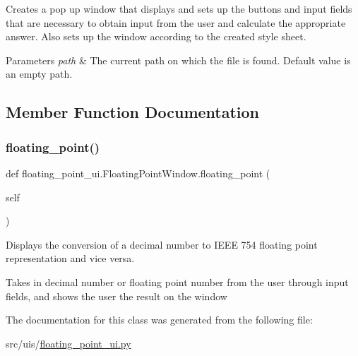 Creates a pop up window that displays and sets up the buttons and input fields that are necessary to obtain input from the user and calculate the appropriate answer. Also sets up the window according to the created style sheet. 
\begin{DoxyParams}{Parameters}
{\em path} & The current path on which the file is found. Default value is an empty path. \\
\hline
\end{DoxyParams}


\subsection{Member Function Documentation}
\mbox{\label{classfloating__point__ui_1_1_floating_point_window_a3e36de9fde9b6387740d13a644fdfc56}} 
\subsubsection{\texorpdfstring{floating\+\_\+point()}{floating\_point()}}
{\footnotesize\ttfamily def floating\+\_\+point\+\_\+ui.\+Floating\+Point\+Window.\+floating\+\_\+point (\begin{DoxyParamCaption}\item[{}]{self }\end{DoxyParamCaption})}



Displays the conversion of a decimal number to I\+E\+EE 754 floating point representation and vice versa. 

Takes in decimal number or floating point number from the user through input fields, and shows the user the result on the window 

The documentation for this class was generated from the following file\+:\begin{DoxyCompactItemize}
\item 
src/uis/\hyperlink{floating__point__ui_8py}{floating\+\_\+point\+\_\+ui.\+py}\end{DoxyCompactItemize}
